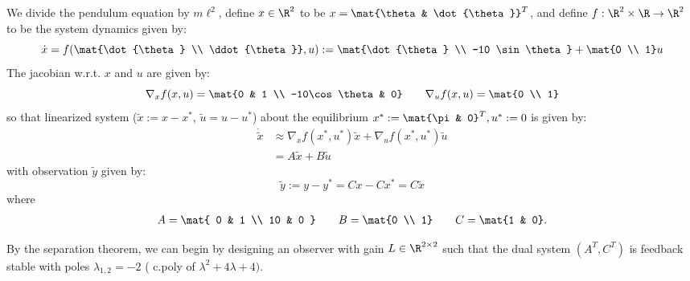 \documentclass{homework}
\begin{document}
\subsection{}
\begin{letterenum}
\item We divide the pendulum equation by $m\ell^2$, define $x\in\R^2$ to be
$x = \mat{\theta & \dot{\theta}}^T$, and define $f: \R^2 \times \R \to \R^2$ to be
the system dynamics given by:
\begin{equation*}
    \dot{x} = f(\mat{\dot{\theta} \\ \ddot{\theta}}, u) := \mat{\dot{\theta} \\ -10 \sin\theta} + \mat{0 \\ 1} u
\end{equation*}
The jacobian w.r.t. $x$ and $u$ are given by:
\begin{equation*}
    \nabla_x f(x, u) = \mat{0 & 1 \\ -10\cos\theta & 0} \qquad \nabla_u f(x, u) = \mat{0 \\ 1}
\end{equation*}
so that linearized system ($\tilde{x} := x - x^*$, $\tilde{u} = u - u^*$) about the equilibrium
$x^* := \mat{\pi & 0}^T, u^* := 0$ is given by:
\begin{align*}
    \dot{\tilde{x}} &\approx \nabla_x f(x^*, u^*) \tilde{x} + \nabla_u f(x^*, u^*) \tilde{u} \\
        &= A \tilde{x} + B \tilde{u}
\end{align*}
with observation $\tilde{y}$ given by:
\begin{equation*}
    \tilde{y} := y - y^* = Cx - Cx^* = C\tilde{x}
\end{equation*}
where
\begin{align*}
    A = \mat{
            0 & 1 \\
            10 & 0
        } \qquad B = \mat{0 \\ 1} \qquad C = \mat{1 & 0}.
\end{align*}

By the separation theorem, we can begin by designing an observer with gain $L\in\R^{2\times 2}$
such that the dual system $(A^T, C^T)$ is feedback stable with poles $\lambda_{1,2} = -2$ (
    c.poly of $\lambda^2 + 4 \lambda + 4)$.


\end{letterenum}
\end{document}
